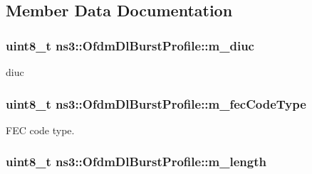 \subsection{Member Data Documentation}
\subsubsection[{\texorpdfstring{m\+\_\+diuc}{m_diuc}}]{\setlength{\rightskip}{0pt plus 5cm}uint8\+\_\+t ns3\+::\+Ofdm\+Dl\+Burst\+Profile\+::m\+\_\+diuc\hspace{0.3cm}{\ttfamily [private]}}\hypertarget{classns3_1_1OfdmDlBurstProfile_aeea265c163914bbfc45936dcee9fa757}{}\label{classns3_1_1OfdmDlBurstProfile_aeea265c163914bbfc45936dcee9fa757}


diuc 

\subsubsection[{\texorpdfstring{m\+\_\+fec\+Code\+Type}{m_fecCodeType}}]{\setlength{\rightskip}{0pt plus 5cm}uint8\+\_\+t ns3\+::\+Ofdm\+Dl\+Burst\+Profile\+::m\+\_\+fec\+Code\+Type\hspace{0.3cm}{\ttfamily [private]}}\hypertarget{classns3_1_1OfdmDlBurstProfile_ad578a18b0de8307a99ad64eec0537be4}{}\label{classns3_1_1OfdmDlBurstProfile_ad578a18b0de8307a99ad64eec0537be4}


F\+EC code type. 

\subsubsection[{\texorpdfstring{m\+\_\+length}{m_length}}]{\setlength{\rightskip}{0pt plus 5cm}uint8\+\_\+t ns3\+::\+Ofdm\+Dl\+Burst\+Profile\+::m\+\_\+length\hspace{0.3cm}{\ttfamily [private]}}\hypertarget{classns3_1_1OfdmDlBurstProfile_ad642fbb6fdbf3225b68f565e26775624}{}\label{classns3_1_1OfdmDlBurstProfile_ad642fbb6fdbf3225b68f565e26775624}


